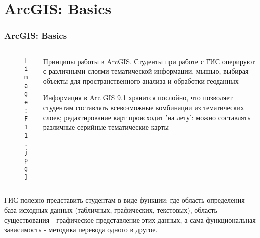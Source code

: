 \documentclass[pdflatex,compress,8pt,
	xcolor={dvipsnames,dvipsnames,svgnames,x11names,table},
	hyperref={	 
	pdfauthor={Lemenkova Polina}, 
	pdfsubject={Preentation}, 
	pdfcreator={Lemenkova Polina}, 
	pdfproducer={Lemenkova Polina}, 
	colorlinks=true,
	linkcolor=Red3, 
	citecolor=NavyBlue, 
	urlcolor = NavyBlue, 
	breaklinks = true}]{beamer}
\begin{document}
\section{ArcGIS: Basics}
\begin{frame}\frametitle{ArcGIS: Basics}

	\begin{minipage}[0.4\textheight]{\textwidth}
		\begin{columns}[T]
			\begin{column}{0.5\textwidth}
				\vspace{2em}
				\begin{figure}[H]
					\centering
					\texttt{[image: F11.jpg]}
				\end{figure}
			\end{column}
			\begin{column}{0.5\textwidth}
\begin{alertblock}{}
Принципы работы в ArcGIS. Студенты при работе с ГИС оперируют с различными слоями тематической информации, мышью, выбирая объекты для пространственного анализа и обработки геоданных
\end{alertblock}

\begin{alertblock}{}
Информация в Arc GIS 9.1 хранится послойно, что позволяет студентам составлять всевозможные комбинации из тематических слоев; редактирование карт происходит 'на лету': можно составлять различные серийные тематические карты
\end{alertblock}
			\end{column}
		\end{columns}
	\end{minipage}

\begin{block}{}
ГИС полезно  представить студентам в виде функции; где область определения - база исходных данных (табличных, графических, текстовых), область существования -  графическое представление этих данных, а сама функциональная зависимость -  методика перевода одного в другое.
\end{block}

\end{frame}
\end{document}
